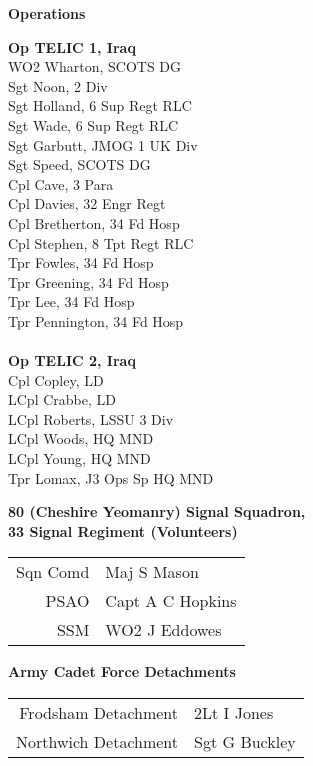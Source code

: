 \begin{center}
  \Large
  \textbf{Operations}
\end{center}

\begin{multicols}{2}
  \small
  \noindent
  \textbf{Op TELIC 1, Iraq} \\
  WO2 Wharton, SCOTS DG \\
  Sgt Noon, 2 Div \\
  Sgt Holland, 6 Sup Regt RLC \\
  Sgt Wade, 6 Sup Regt RLC \\
  Sgt Garbutt, JMOG 1 UK Div \\
  Sgt Speed, SCOTS DG \\
  Cpl Cave, 3 Para \\
  Cpl Davies, 32 Engr Regt \\
  Cpl Bretherton, 34 Fd Hosp \\
  Cpl Stephen, 8 Tpt Regt RLC \\
  Tpr Fowles, 34 Fd Hosp \\
  Tpr Greening, 34 Fd Hosp \\
  Tpr Lee, 34 Fd Hosp \\
  Tpr Pennington, 34 Fd Hosp \\
  \\
  \textbf{Op TELIC 2, Iraq} \\
  Cpl Copley, LD \\
  LCpl Crabbe, LD \\
  LCpl Roberts, LSSU 3 Div \\
  LCpl Woods, HQ MND \\
  LCpl Young, HQ MND \\
  Tpr Lomax, J3 Ops Sp HQ MND \\
\end{multicols}

\pagebreak

\vspace*{10mm}

\begin{center}
  \Large
  \textbf{80 (Cheshire Yeomanry) Signal Squadron, \\ 33 Signal Regiment (Volunteers)}
\end{center}

\begin{center}
  \begin{tabular}{rl}
    Sqn Comd & Maj S Mason \\
    PSAO & Capt A C Hopkins \\
    SSM & WO2 J Eddowes \\
  \end{tabular}
\end{center}

\vspace*{10mm}

\begin{center}
  \Large
  \textbf{Army Cadet Force Detachments}
\end{center}

\begin{center}
  \begin{tabular}{rl}
    Frodsham Detachment & 2Lt I Jones \\
    Northwich Detachment & Sgt G Buckley \\
  \end{tabular}
\end{center}
